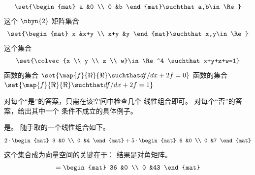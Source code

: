 \begin{exercises}
\begin{exparts}
        \begin{equation*}
          \set{\begin{mat}
            a  &0  \\
            0  &b
          \end{mat}\suchthat a,b\in\Re}
        \end{equation*}
      \partsitem 这个 \( \nbyn{2} \) 矩阵集合
        \begin{equation*}
          \set{\begin{mat}
            x    &x+y  \\
            x+y  &y
          \end{mat}\suchthat x,y\in\Re}
        \end{equation*}
      \partsitem 这个集合
        \begin{equation*}
          \set{\colvec{x \\ y \\ z \\ w}\in\Re^4
               \suchthat x+y+z+w=1}
        \end{equation*}
      \partsitem 函数的集合
        \( \set{\map{f}{\Re}{\Re}\suchthat df/dx+2f=0} \)
      \partsitem 函数的集合
        \( \set{\map{f}{\Re}{\Re}\suchthat df/dx+2f=1} \)
    \end{exparts}
    \begin{answer}
      对每个“是”的答案，只需在该空间中检查几个
      线性组合即可。
      对每个“否”的答案，给出其中一个
      条件不成立的具体例子。
      \begin{exparts}
        \partsitem 是。
          随手取的一个线性组合如下。
          \begin{equation*}
            2\cdot\begin{mat}
              3  &0 \\
              0  &4
            \end{mat}
            +5\cdot\begin{mat}
              6  &0 \\
              0  &7
            \end{mat}
          \end{equation*}
          这个集合成为向量空间的关键在于：
          结果是对角矩阵。
          \begin{equation*}
            =\begin{mat}
              36 &0 \\
              0  &43
            \end{mat}
          \end{equation*}

\end{exparts}
\end{answer}
\end{exercises}
